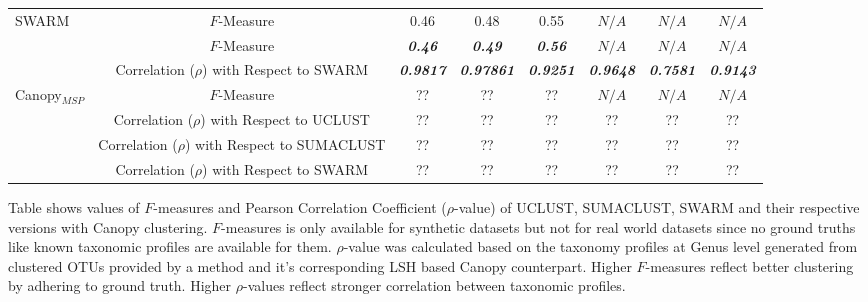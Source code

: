 \documentclass[10pt, conference, compsocconf]{IEEEtran}
\begin{document}
\begin{table}[t]
{\begin{tabular}{|l|c c c c| c c c|}
			\hline
			
			\multirow{1}{*}{SWARM} & $F$-Measure & 0.46 & 0.48 & 0.55 & $N/A$ & $N/A$ & $N/A$\\
						
			\hdashline
			
			\multirow{2}{*}{Canopy$_{SWARM}$} & $F$-Measure & \textit{\textbf{0.46}} & \textit{\textbf{0.49}} & \textit{\textbf{0.56}} & $N/A$ & $N/A$ & $N/A$\\
			& Correlation ($\rho$) with Respect to SWARM & \textit{\textbf{0.9817}} & \textit{\textbf{0.97861}} & \textit{\textbf{0.9251}} & \textit{\textbf{0.9648}} & \textit{\textbf{0.7581}} & \textit{\textbf{0.9143}}\\
			
			\hline
			
			\multirow{4}{*}{Canopy$_{MSP}$} & $F$-Measure & ?? & ?? & ?? & $N/A$ & $N/A$ & $N/A$\\
			& Correlation ($\rho$) with Respect to UCLUST & ?? & ?? & ?? & ?? & ?? & ?? \\ & Correlation ($\rho$) with Respect to SUMACLUST & ?? & ?? & ?? & ?? & ?? & ?? \\  & Correlation ($\rho$) with Respect to SWARM & ?? & ?? & ?? & ?? & ?? & ??  \\
			
			\hline
			
		\end{tabular}
	}
	\small
	\begin{tablenotes}
		\item Table shows values of $F$-measures and Pearson Correlation Coefficient ($\rho$-value) of UCLUST, SUMACLUST, SWARM and their respective versions with Canopy clustering. $F$-measures is only available for synthetic datasets but not for real world datasets since no ground truths like known taxonomic profiles are available for them. $\rho$-value was calculated based on the taxonomy profiles at Genus level generated from clustered OTUs provided by a method and it's corresponding LSH based Canopy counterpart. Higher $F$-measures reflect better clustering by adhering to ground truth. Higher $\rho$-values reflect stronger correlation between taxonomic profiles.        
	\end{tablenotes}
	
\end{table} 
\end{document}
